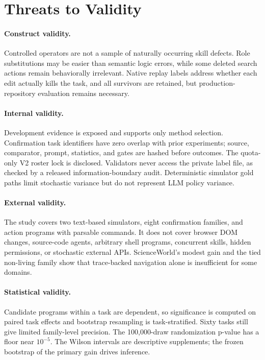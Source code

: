 \documentclass[10pt]{article}
\begin{document}
\section{Threats to Validity}
\paragraph{Construct validity.}
Controlled operators are not a sample of naturally occurring skill defects. Role substitutions may be easier than semantic logic errors, while some deleted search actions remain behaviorally irrelevant. Native replay labels address whether each edit actually kills the task, and all survivors are retained, but production-repository evaluation remains necessary.

\paragraph{Internal validity.}
Development evidence is exposed and supports only method selection. Confirmation task identifiers have zero overlap with prior experiments; source, comparator, prompt, statistics, and gates are hashed before outcomes. The quota-only V2 roster lock is disclosed. Validators never access the private label file, as checked by a released information-boundary audit. Deterministic simulator gold paths limit stochastic variance but do not represent LLM policy variance.

\paragraph{External validity.}
The study covers two text-based simulators, eight confirmation families, and action programs with parsable commands. It does not cover browser DOM changes, source-code agents, arbitrary shell programs, concurrent skills, hidden permissions, or stochastic external APIs. ScienceWorld's modest gain and the tied non-living family show that trace-backed navigation alone is insufficient for some domains.

\paragraph{Statistical validity.}
Candidate programs within a task are dependent, so significance is computed on paired task effects and bootstrap resampling is task-stratified. Sixty tasks still give limited family-level precision. The 100,000-draw randomization p-value has a floor near $10^{-5}$. The Wilson intervals are descriptive supplements; the frozen bootstrap of the primary gain drives inference.
\end{document}
